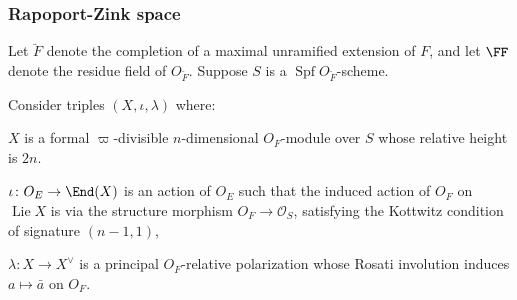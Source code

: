 \documentclass[11pt]{beamer}
\DeclareMathOperator{\Lie}{Lie}
\DeclareMathOperator{\Spf}{Spf}
\renewcommand{\OO}{O}
\newcommand{\Sheaf}{\mathcal O}
\begin{document}
\begin{frame}
  \frametitle{Rapoport-Zink space}
  \begin{itemize}
    \ii Let $\breve F$ denote the completion of a maximal unramified extension of $F$,
    and let $\FF$ denote the residue field of $\OO_{\breve F}$.
    \ii Suppose $S$ is a $\Spf \OO_{\breve F}$-scheme.
  \end{itemize}
  \begin{definition}
  Consider triples $(X, \iota, \lambda)$ where:
  \begin{itemize}
    \ii $X$ is a formal $\varpi$-divisible $n$-dimensional $\OO_F$-module over $S$
    whose relative height is $2n$.

    \ii $\iota \colon \OO_E \to \End(X)$ is an action of $\OO_E$
    such that the induced action of $\OO_F$ on $\Lie X$
    is via the structure morphism $\OO_F \to \Sheaf_S$,
    satisfying the Kottwitz condition of signature $(n-1,1)$,

    \ii $\lambda \colon X \to X^\vee$ is a principal $\OO_F$-relative polarization
    whose Rosati involution induces $a \mapsto \bar a$ on $\OO_F$.
   \end{itemize}
  \end{definition}
\end{frame}
\end{document}
